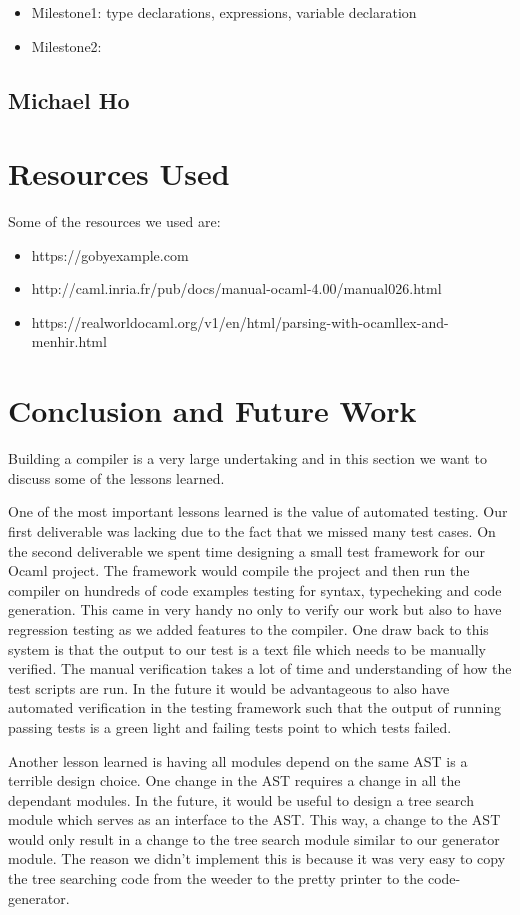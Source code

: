 \documentclass{article}
\begin{document}
\begin{itemize}
\item Milestone1: type declarations, expressions, variable declaration
\item Milestone2: 
\end{itemize}
	
\subsection{Michael Ho}


\section{Resources Used}
Some of the resources we used are: 

\begin{itemize}
\item https://gobyexample.com  
\item http://caml.inria.fr/pub/docs/manual-ocaml-4.00/manual026.html
\item https://realworldocaml.org/v1/en/html/parsing-with-ocamllex-and-menhir.html
\end{itemize}


\section{Conclusion and Future Work}
Building a compiler is a very large undertaking and in this section we want to discuss some of the lessons learned.


One of the most important lessons learned is the value of automated testing. Our first deliverable was lacking due to the fact that we missed many test cases. On the second deliverable we spent time designing a small test framework for our Ocaml project. The framework would compile the project and then run the compiler on hundreds of code examples testing for syntax, typecheking and code generation. This came in very handy no only to verify our work but also to have regression testing as we added features to the compiler. One draw back to this system is that the output to our test is a text file which needs to be manually verified. The manual verification takes a lot of time and understanding of how the test scripts are run. In the future it would be advantageous to also have automated verification in the testing framework such that the output of running passing tests is a green light and failing tests point to which tests failed. 


Another lesson learned is having all modules depend on the same AST is a terrible design choice. One change in the AST requires a change in all the dependant modules. In the future, it would be useful to design a tree search module which serves as an interface to the AST. This way, a change to the AST would only result in a change to the tree search module similar to our generator module. The reason we didn't implement this is because it was very easy to copy the tree searching code from the weeder to the pretty printer to the code-generator. 




\end{document}
